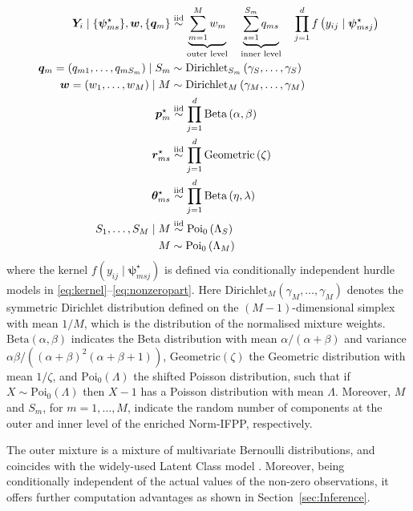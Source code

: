 \documentclass[11pt]{article}
\newcommand{\iid}{\overset{\textnormal{iid}}{\sim}}
\begin{document}
\begin{equation}\label{eq:model_general}
\begin{aligned}
	\bm Y_i\mid \{\bm\psi^\star_{ms}\}, \bm w, \{\bm q_{m}\}  & \iid \underbrace{\sum_{m=1}^M w_m}_{\text{outer level}} \quad \underbrace{\sum_{s=1}^{S_m} q_{ms}}_{\text{inner level}} \quad \prod_{j=1}^d f\left(y_{ij} \mid \bm \psi^\star_{msj}\right) \\
	\bm q_m = \left(q_{m1},\ldots,q_{mS_m}\right) \mid S_m & \sim
	\text{Dirichlet}_{S_m}\left(\gamma_S, \ldots, \gamma_S\right)\\
	\bm w = \left(w_1,\ldots,w_M\right)\mid M &\sim \text{Dirichlet}_{M}\left(\gamma_M, \ldots, \gamma_M\right) \\
	\bm p^\star_m &\iid \prod_{j=1}^d \text{Beta}\left(\alpha, \beta\right)\\
	\bm r^\star_{ms} &\iid \prod_{j=1}^d \text{Geometric}\left(\zeta\right)\\
	\bm\theta^\star_{ms} &\iid \prod_{j=1}^d \text{Beta}\left(\eta,\lambda\right)\\
	S_1,\ldots, S_M\mid M  %
	&\iid \text{Poi}_0\left(\Lambda_S\right)\\
	M %
	&\sim \text{Poi}_0\left(\Lambda_M\right) 
\end{aligned}
\end{equation}
where the kernel $f\left(y_{ij}\mid \bm \psi^\star_{msj} \right) $ is defined via conditionally independent hurdle models in \eqref{eq:kernel}--\eqref{eq:nonzeropart}. Here $\text{Dirichlet}_{M}(\gamma_M, \ldots, \gamma_M)$ denotes the symmetric Dirichlet distribution defined on the $(M-1)$-dimensional simplex with mean $1/M$, which is the distribution of the normalised mixture weights. $\text{Beta}\left(\alpha, \beta\right)$ indicates the Beta distribution with mean $\alpha/(\alpha + \beta)$ and variance $\alpha \beta / ((\alpha + \beta)^2(\alpha + \beta + 1))$,  $\text{Geometric}\left(\zeta\right)$ the Geometric distribution with mean $1/\zeta$, and $\text{Poi}_0(\Lambda)$ the shifted Poisson distribution, such that if $X \sim \text{Poi}_0(\Lambda)$ then $X - 1$ has a Poisson distribution with mean $\Lambda$. Moreover, $M$ and $S_m$, for $m=1,\ldots,M$, indicate the random number of components at the outer and inner level of the enriched Norm-IFPP, respectively.

The outer mixture is a mixture of multivariate Bernoulli distributions, and coincides with the widely-used Latent Class model \citep{lazzaro}. Moreover, being conditionally independent of the actual values of the non-zero observations, it offers further computation advantages as shown in Section~\ref{sec:Inference}. 
\end{document}
